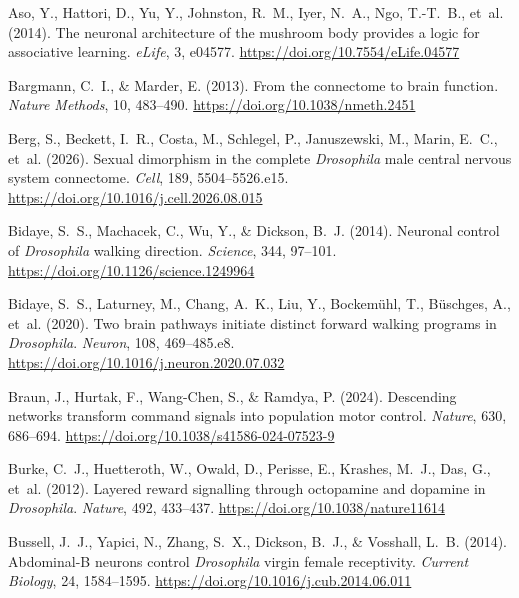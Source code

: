 
Aso, Y., Hattori, D., Yu, Y., Johnston, R.~M., Iyer, N.~A., Ngo, T.-T.~B., et~al. (2014). The neuronal architecture of the mushroom body provides a logic for associative learning. \emph{eLife}, 3, e04577. \url{https://doi.org/10.7554/eLife.04577}

Bargmann, C.~I., \& Marder, E. (2013). From the connectome to brain function. \emph{Nature Methods}, 10, 483--490. \url{https://doi.org/10.1038/nmeth.2451}

Berg, S., Beckett, I.~R., Costa, M., Schlegel, P., Januszewski, M., Marin, E.~C., et~al. (2026). Sexual dimorphism in the complete \emph{Drosophila} male central nervous system connectome. \emph{Cell}, 189, 5504--5526.e15. \url{https://doi.org/10.1016/j.cell.2026.08.015}

Bidaye, S.~S., Machacek, C., Wu, Y., \& Dickson, B.~J. (2014). Neuronal control of \emph{Drosophila} walking direction. \emph{Science}, 344, 97--101. \url{https://doi.org/10.1126/science.1249964}

Bidaye, S.~S., Laturney, M., Chang, A.~K., Liu, Y., Bockem\"{u}hl, T., B\"{u}schges, A., et~al. (2020). Two brain pathways initiate distinct forward walking programs in \emph{Drosophila}. \emph{Neuron}, 108, 469--485.e8. \url{https://doi.org/10.1016/j.neuron.2020.07.032}

Braun, J., Hurtak, F., Wang-Chen, S., \& Ramdya, P. (2024). Descending networks transform command signals into population motor control. \emph{Nature}, 630, 686--694. \url{https://doi.org/10.1038/s41586-024-07523-9}

Burke, C.~J., Huetteroth, W., Owald, D., Perisse, E., Krashes, M.~J., Das, G., et~al. (2012). Layered reward signalling through octopamine and dopamine in \emph{Drosophila}. \emph{Nature}, 492, 433--437. \url{https://doi.org/10.1038/nature11614}

Bussell, J.~J., Yapici, N., Zhang, S.~X., Dickson, B.~J., \& Vosshall, L.~B. (2014). Abdominal-B neurons control \emph{Drosophila} virgin female receptivity. \emph{Current Biology}, 24, 1584--1595. \url{https://doi.org/10.1016/j.cub.2014.06.011}


